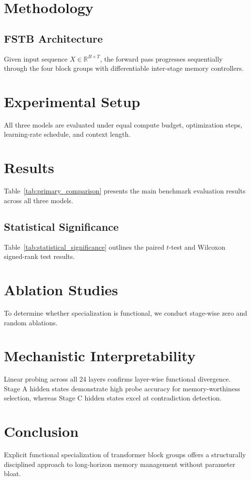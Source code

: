 \documentclass[11pt,a4paper]{article}
\begin{document}
\section{Methodology}
\subsection{FSTB Architecture}
Given input sequence $X \in \mathbb{R}^{B \times T}$, the forward pass progresses sequentially through the four block groups with differentiable inter-stage memory controllers.



\section{Experimental Setup}
All three models are evaluated under equal compute budget, optimization steps, learning-rate schedule, and context length.

\section{Results}
Table~\ref{tab:primary_comparison} presents the main benchmark evaluation results across all three models.



\subsection{Statistical Significance}
Table~\ref{tab:statistical_significance} outlines the paired $t$-test and Wilcoxon signed-rank test results.



\section{Ablation Studies}
To determine whether specialization is functional, we conduct stage-wise zero and random ablations.



\section{Mechanistic Interpretability}
Linear probing across all 24 layers confirms layer-wise functional divergence. Stage A hidden states demonstrate high probe accuracy for memory-worthiness selection, whereas Stage C hidden states excel at contradiction detection.

\section{Conclusion}
Explicit functional specialization of transformer block groups offers a structurally disciplined approach to long-horizon memory management without parameter bloat.



\end{document}
